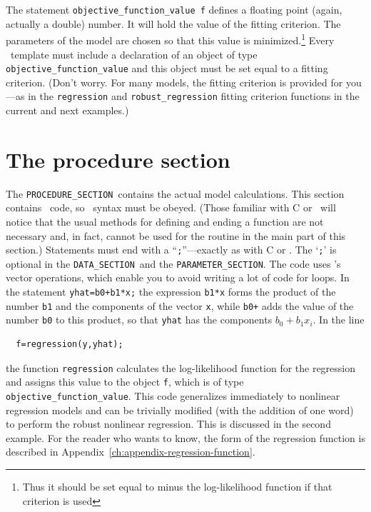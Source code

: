 \documentclass{admbmanual}
\newcommand\DS{\texttt{DATA\_SECTION}}
\newcommand\PS{\texttt{PARAMETER\_SECTION}}
\newcommand\PROS{\texttt{PROCEDURE\_SECTION}}
\begin{document}
The statement \texttt{objective\_function\_value f} defines a floating point
(again, actually a double) number. It will hold the value of the fitting
criterion. The parameters of the model are chosen so that this value is
minimized.\footnote{Thus it should be set equal to minus the log-likelihood
  function if that criterion is used} Every \ADM\ template must include a
declaration of an object of type \texttt{objective\_function\_value} and this
object must be set equal to a fitting criterion. (Don't worry. For many models,
the fitting criterion is provided for you---as in the \texttt{regression} and
\texttt{robust\_regression} fitting criterion functions in the current and next
examples.)

\section{The procedure section}

The \PROS\ contains the actual model calculations. This section contains \cplus\
code, so \cplus\ syntax must be obeyed. (Those familiar with C or \cplus\ will
notice that the usual methods for defining and ending a function are not
necessary and, in fact, cannot be used for the routine in the main part of this
section.)
Statements must end with a ``\texttt{;}''---exactly as with C or \cplus. The
`\texttt{;}' is optional in the \DS\ and the \PS. The code uses \scAD's vector
operations, which enable you to avoid writing a lot of code for loops. In the
statement \texttt{yhat=b0+b1*x;} the expression \texttt{b1*x} forms the product
of the number \texttt{b1} and the components of the vector \texttt{x}, while
\texttt{b0+} adds the value of the number \texttt{b0} to this product, so that
\texttt{yhat} has the components $b_0+b_1x_i$. In the line
\begin{lstlisting}
  f=regression(y,yhat);
\end{lstlisting}
the function \texttt{regression} calculates the log-likelihood function for the
regression and assigns this value to the object \texttt{f}, which is of type
\texttt{objective\_function\_value}. This code generalizes immediately to
nonlinear regression models and can be trivially modified (with the addition of
one word) to perform the robust nonlinear regression. This is discussed in the
second example. For the reader who wants to know, the form of the regression
function is described in Appendix~\ref{ch:appendix-regression-function}.
\X{use of \fontindexentry{tt}{regression} function}
\end{document}
